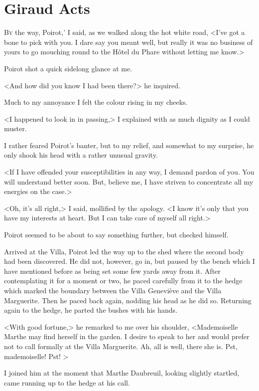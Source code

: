 \chapter{Giraud Acts}
	
\lettrine[ante=`]{B}{y} the way, Poirot,' I said, as we walked along the hot white road, <I've got a bone to pick with you. I dare say you meant well, but really it was no business of yours to go mouching round to the Hôtel du Phare without letting me know.> 

 Poirot shot a quick sidelong glance at me. 

 <And how did you know I had been there?> he inquired. 

 Much to my annoyance I felt the colour rising in my cheeks. 

 <I happened to look in in passing,> I explained with as much dignity as I could muster. 

 I rather feared Poirot's banter, but to my relief, and somewhat to my surprise, he only shook his head with a rather unusual gravity. 

 <If I have offended your susceptibilities in any way, I demand pardon of you. You will understand better soon. But, believe me, I have striven to concentrate all my energies on the case.> 

 <Oh, it's all right,> I said, mollified by the apology. <I know it's only that you have my interests at heart. But I can take care of myself all right.> 

 Poirot seemed to be about to say something further, but checked himself. 

 Arrived at the Villa, Poirot led the way up to the shed where the second body had been discovered. He did not, however, go in, but paused by the bench which I have mentioned before as being set some few yards away from it. After contemplating it for a moment or two, he paced carefully from it to the hedge which marked the boundary between the Villa Geneviève and the Villa Marguerite. Then he paced back again, nodding his head as he did so. Returning again to the hedge, he parted the bushes with his hands. 

 <With good fortune,> he remarked to me over his shoulder, <Mademoiselle Marthe may find herself in the garden. I desire to speak to her and would prefer not to call formally at the Villa Marguerite. Ah, all is well, there she is. Pst, mademoiselle! Pst! > 

 I joined him at the moment that Marthe Daubreuil, looking slightly startled, came running up to the hedge at his call. 

